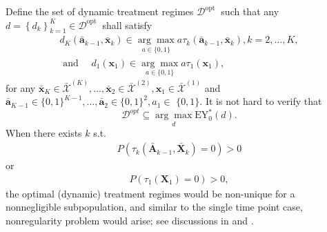 \documentclass[11pt]{article}
\theoremstyle{referenceplain}
\theoremstyle{referencedefinition}
\theoremstyle{referenceremark}
\begin{document}
Define the set of dynamic treatment regimes $\mathcal{D}^{\text {opt }}$ such that any $d=\left\{d_k\right\}_{k=1}^K \in \mathcal{D}^{\text {opt }}$ shall satisfy
$$
\begin{array}{r}
d_K\left(\bar{\mathbf{a}}_{k-1}, \bar{\mathbf{x}}_k\right) \in \underset{a \in\{0,1\}}{\arg \max } a \tau_k\left(\bar{\mathbf{a}}_{k-1}, \bar{\mathbf{x}}_k\right), k=2, \ldots, K, \\
\text { and } \quad d_1\left(\mathbf{x}_1\right) \in \underset{a \in\{0,1\}}{\arg \max } a \tau_1\left(\mathbf{x}_1\right),
\end{array}
$$
for any $\bar{\mathbf{x}}_K \in \bar{\mathcal{X}}^{(K)}, \ldots, \bar{\mathbf{x}}_2 \in \bar{\mathcal{X}}^{(2)}, \mathbf{x}_1 \in \bar{\mathcal{X}}^{(1)}$ and $\bar{\mathbf{a}}_{K-1} \in\{0,1\}^{K-1}, \ldots, \bar{\mathbf{a}}_2 \in\{0,1\}^2, a_1 \in$ $\{0,1\}$. It is not hard to verify that
$$
\mathcal{D}^{o p t} \subseteq \underset{d}{\arg \max } \mathrm{EY}_0^*(d).
$$
When there exists $k$ s.t. 
\begin{align*}
    P(\tau_k\left(\bar{\mathbf{A}}_{k-1}, \bar{\mathbf{X}}_k\right)=0)>0
\end{align*}
or
\begin{align*}
    P(\tau_1\left(\mathbf{X}_1\right)=0)>0,
\end{align*}
the optimal (dynamic) treatment regimes would be non-unique for a nonnegligible subpopulation, and similar to the single time point case, nonregularity problem would arise; see discussions in \citet{luedtke2016statistical} and \citet{shi2020breaking}.
\end{document}
